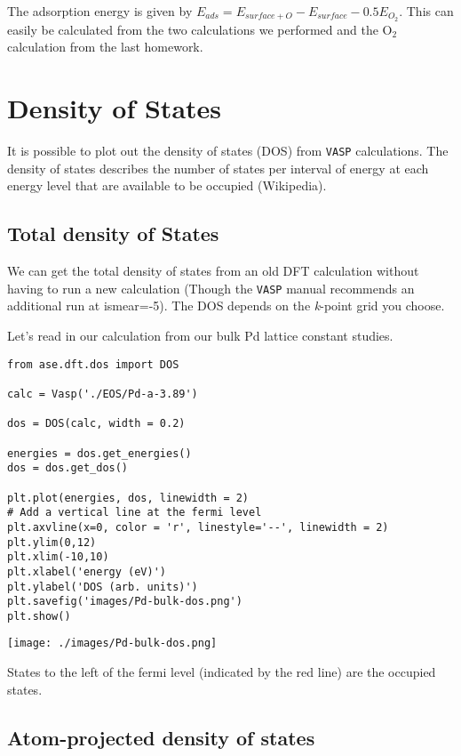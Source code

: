 \documentclass[11pt]{article}
\begin{document}
The adsorption energy is given by \(E_{ads} = E_{surface+O} - E_{surface} - 0.5 E_{O_{2}}\). This can easily be calculated from the two calculations we performed and the O\(_{\text{2}}\) calculation from the last homework.


\section{Density of States}
\label{sec:orgb34bf42}

It is possible to plot out the density of states (DOS) from \texttt{VASP} calculations. The density of states describes the number of states per interval of energy at each energy level that are available to be occupied (Wikipedia). 

\subsection{Total density of States}
\label{sec:org662f757}

We can get the total density of states from an old DFT calculation without having to run a new calculation (Though the \texttt{VASP} manual recommends an additional run at ismear=-5). The DOS depends on the \emph{k}-point grid you choose.


Let's read in our calculation from our bulk Pd lattice constant studies.

\begin{verbatim}
from ase.dft.dos import DOS

calc = Vasp('./EOS/Pd-a-3.89')

dos = DOS(calc, width = 0.2)

energies = dos.get_energies()
dos = dos.get_dos()

plt.plot(energies, dos, linewidth = 2)
# Add a vertical line at the fermi level
plt.axvline(x=0, color = 'r', linestyle='--', linewidth = 2)
plt.ylim(0,12)
plt.xlim(-10,10)
plt.xlabel('energy (eV)')
plt.ylabel('DOS (arb. units)')
plt.savefig('images/Pd-bulk-dos.png')
plt.show()
\end{verbatim}

\begin{center}
\texttt{[image: ./images/Pd-bulk-dos.png]}
\end{center}

States to the left of the fermi level (indicated by the red line) are the occupied states.


\subsection{Atom-projected density of states}
\label{sec:org39fcc69}
\end{document}
